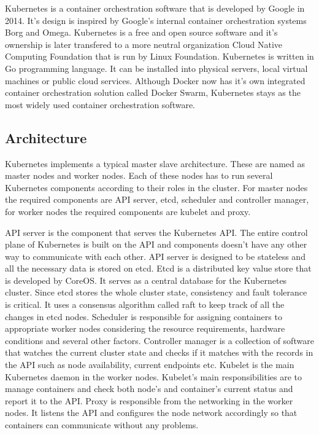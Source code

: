 \documentclass[12pt,oneandhalf,chaparabic,ceng,ms,eng,oneside,pntc]{gsufbe}
\begin{document}
Kubernetes is a container orchestration software that is developed by Google in 2014. It's design is
inspired by Google's internal container orchestration systems Borg and Omega. Kubernetes is a free and
open source software and it's ownership is later transfered to a more neutral organization Cloud Native
Computing Foundation that is run by Linux Foundation. Kubernetes is written in Go programming language.
It can be installed into physical servers, local virtual machines or public cloud services. Although
Docker now has it's own integrated container orchestration solution called Docker Swarm, Kubernetes
stays as the most widely used container orchestration software.

\subsection{Architecture}
Kubernetes implements a typical master slave architecture. These are named as master nodes and worker
nodes. Each of these nodes has to run several Kubernetes components according to their roles in the
cluster. For master nodes the required components are API server, etcd, scheduler and
controller manager, for worker nodes the required components are kubelet and proxy.

API server is the component that serves the Kubernetes API. The entire control plane of Kubernetes is
built on the API and components doesn't have any other way to communicate with each other. API server
is designed to be stateless and all the necessary data is stored on etcd.
Etcd is a distributed key value store that is developed by CoreOS. It serves as a central database for
the Kubernetes cluster. Since etcd stores the whole cluster state, consistency and fault tolerance is
critical. It uses a consensus algorithm called raft to keep track of all the changes in etcd nodes.
Scheduler is responsible for assigning containers to appropriate worker nodes considering the resource
requirements, hardware conditions and several other factors.
Controller manager is a collection of software that watches the current cluster state and checks if it
matches with the records in the API such as node availability, current endpoints etc.
Kubelet is the main Kubernetes daemon in the worker nodes. Kubelet's main responsibilities are to 
manage containers and check both node's and container's current status and report it to the API.
Proxy is responsible from the networking in the worker nodes. It listens the API and configures the
node network accordingly so that containers can communicate without any problems.
\end{document}
